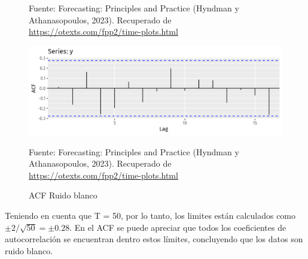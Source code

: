 \begin{itemize}
\begin{figure}[H]
        \begin{minipage}[t]{0.9\textwidth}
            Fuente: Forecasting: Principles and Practice (Hyndman y Athanasopoulos, 2023). Recuperado de \url{https://otexts.com/fpp2/time-plots.html}
        \end{minipage}
    \end{figure}

    \begin{figure}[H]
        \begin{minipage}[t]{0.9\textwidth}
            \caption{ACF Ruido blanco}
            \label{whitenoise2}        
        \end{minipage}
    
        \vspace{10pt}
    
        \begin{minipage}[b]{0.9\textwidth}
            \centering
            \includegraphics[width=\textwidth]{img/wnoiseacf-1.png}        
        \end{minipage}
    
        \begin{minipage}[t]{0.9\textwidth}
            Fuente: Forecasting: Principles and Practice (Hyndman y Athanasopoulos, 2023). Recuperado de \url{https://otexts.com/fpp2/time-plots.html}
        \end{minipage}
    \end{figure}

    Teniendo en cuenta que T = 50, por lo tanto, los limites están calculados como $\pm{2}/\sqrt{50}  = \pm{0.28}$. En el ACF se puede apreciar que todos los coeficientes de autocorrelación se encuentran dentro estos límites, concluyendo que los datos son ruido blanco.

\end{itemize}

